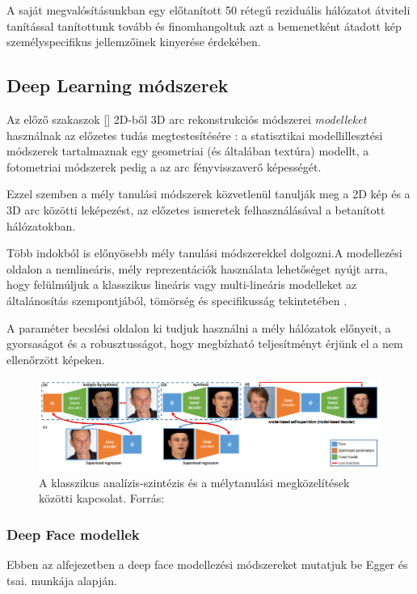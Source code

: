 \documentclass[12pt,a4]{article}
\begin{document}
    A saját megvalósításunkban egy előtanított 50 rétegű reziduális hálózatot átviteli tanítással tanítottunk tovább és finomhangoltuk azt a bemenetként átadott kép személyspecifikus jellemzőinek kinyerése érdekében.
    
    \subsection{Deep Learning módszerek}
	
	Az előző szakaszok [] 2D-ből 3D arc rekonstrukciós módszerei \textit{modelleket} használnak az előzetes tudás megtestesítésére \cite{survey}: a statisztikai modellillesztési módszerek tartalmaznak egy geometriai (és általában textúra) modellt, a fotometriai módszerek pedig a
	az arc fényvisszaverő képességét. 
	
	
	Ezzel szemben a mély tanulási módszerek
	közvetlenül tanulják meg a 2D kép és a 3D arc közötti leképezést, az előzetes ismeretek felhasználásával a betanított hálózatokban.
	
	
	Több indokból is előnyösebb mély tanulási módszerekkel dolgozni.\cite{3dmm}A modellezési oldalon a nemlineáris, mély reprezentációk használata lehetőséget nyújt arra, hogy felülmúljuk a klasszikus lineáris vagy multi-lineáris modelleket az általánosítás szempontjából, tömörség és specifikusság tekintetében \cite{styner}.
	
	
	A paraméter becslési oldalon ki tudjuk használni a mély hálózatok előnyeit, a gyorsaságot és a robusztusságot, hogy megbízható teljesítményt érjünk el a nem ellenőrzött képeken.
	
	\begin{figure}[h]	
		\centering
		\includegraphics[width=1\linewidth]{deep}
		\caption{A klasszikus analízis-szintézis és a mélytanulási megközelítések közötti kapcsolat. 
			Forrás:\cite{3dmm}}
	\end{figure}
	
	\newpage
	\subsubsection{Deep Face modellek}
    Ebben az alfejezetben a deep face modellezési módszereket mutatjuk be \cite{3dmm} Egger és tsai. munkája alapján. \\
 
\end{document}
